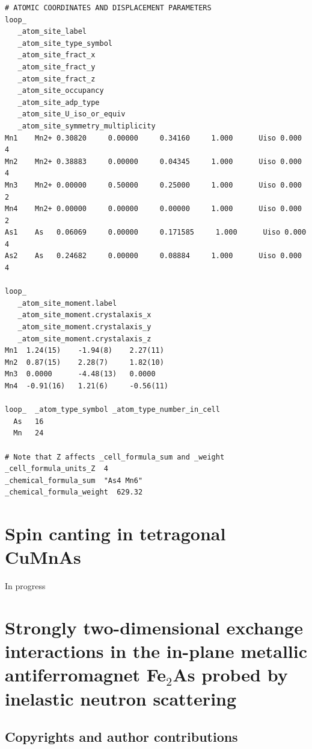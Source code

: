\documentclass[10pt,doublespacing,edeposit]{uiucthesis2020}
\begin{document}
\begin{mainmatter}
\begin{verbatim}
# ATOMIC COORDINATES AND DISPLACEMENT PARAMETERS
loop_ 
   _atom_site_label
   _atom_site_type_symbol
   _atom_site_fract_x
   _atom_site_fract_y
   _atom_site_fract_z
   _atom_site_occupancy
   _atom_site_adp_type
   _atom_site_U_iso_or_equiv
   _atom_site_symmetry_multiplicity
Mn1    Mn2+ 0.30820     0.00000     0.34160     1.000      Uiso 0.000      4   
Mn2    Mn2+ 0.38883     0.00000     0.04345     1.000      Uiso 0.000      4   
Mn3    Mn2+ 0.00000     0.50000     0.25000     1.000      Uiso 0.000      2   
Mn4    Mn2+ 0.00000     0.00000     0.00000     1.000      Uiso 0.000      2   
As1    As   0.06069     0.00000     0.171585     1.000      Uiso 0.000      4   
As2    As   0.24682     0.00000     0.08884     1.000      Uiso 0.000      4   

loop_
   _atom_site_moment.label
   _atom_site_moment.crystalaxis_x
   _atom_site_moment.crystalaxis_y
   _atom_site_moment.crystalaxis_z
Mn1  1.24(15)    -1.94(8)    2.27(11)    
Mn2  0.87(15)    2.28(7)     1.82(10)    
Mn3  0.0000      -4.48(13)   0.0000      
Mn4  -0.91(16)   1.21(6)     -0.56(11)   

loop_  _atom_type_symbol _atom_type_number_in_cell
  As   16
  Mn   24

# Note that Z affects _cell_formula_sum and _weight
_cell_formula_units_Z  4
_chemical_formula_sum  "As4 Mn6"
_chemical_formula_weight  629.32
\end{verbatim}

\chapter{Spin canting in tetragonal CuMnAs}

In progress



\chapter{Strongly two-dimensional exchange interactions in the in-plane metallic antiferromagnet Fe$_2$As probed by inelastic neutron scattering}

\hfill \break

\section{Copyrights and author contributions}


\end{mainmatter}
\end{document}
